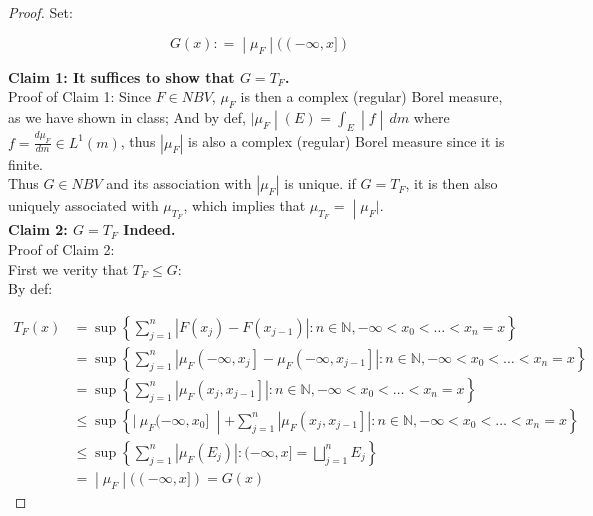 \documentclass{qlnotes-export}
\begin{document}
\begin{proof}

Set:

\[\left. G(x): = \middle| \mu_{F} \middle| (( - \infty,x\rbrack) \right.\]

\textbf{Claim 1: It suffices to show that \(G = T_{F}\).}\\
Proof of Claim 1: Since \(F \in NBV\), \(\mu_{F}\) is then a complex (regular) Borel measure, as we have shown in class; And by def, \(\left. |\mu_{F} \middle| (E) = \int_{E} \middle| f \middle| \, dm \right.\) where \(f = \frac{d\mu_{F}}{dm} \in L^{1}(m)\), thus \(|\mu_{F}|\) is also a complex (regular) Borel measure since it is finite.\\
Thus \(G \in NBV\) and its association with \(|\mu_{F}|\) is unique. if \(G = T_{F}\), it is then also uniquely associated with \(\mu_{T_{F}}\), which implies that \(\left. \mu_{T_{F}} = \middle| \mu_{F}| \right.\).\\
\textbf{Claim 2: \(G = T_{F}\) Indeed.}\\
Proof of Claim 2:\\
First we verity that \(T_{F} \leq G\):\\
By def:

\[\begin{matrix}
{T_{F}(x)} & {= \sup\left\{ {\sum\limits_{j = 1}^{n}\left| {F\left( x_{j} \right) - F\left( x_{j - 1} \right)} \right|:n \in {\mathbb{N}}, - \infty < x_{0} < \ldots < x_{n} = x} \right\}} \\
 & {= \sup\left\{ {\sum\limits_{j = 1}^{n}\left| {\mu_{F}\left( {- \infty,x_{j}} \right\rbrack - \mu_{F}\left( {- \infty,x_{j - 1}} \right\rbrack} \right|:n \in {\mathbb{N}}, - \infty < x_{0} < \ldots < x_{n} = x} \right\}} \\
 & {= \sup\left\{ {\sum\limits_{j = 1}^{n}\left| {\mu_{F}\left( {x_{j},x_{j - 1}} \right\rbrack} \right|:n \in {\mathbb{N}}, - \infty < x_{0} < \ldots < x_{n} = x} \right\}} \\
 & {\leq \sup\left\{ |\ \mu_{F}( - \infty,x_{0}\rbrack\  \middle| + \sum\limits_{j = 1}^{n}\left| {\mu_{F}\left( {x_{j},x_{j - 1}} \right\rbrack} \right|:n \in {\mathbb{N}}, - \infty < x_{0} < \ldots < x_{n} = x \right\}} \\
 & {\leq \sup\left\{ {\sum\limits_{j = 1}^{n}\left| {\mu_{F}\left( E_{j} \right)} \right|:( - \infty,x\rbrack = \bigsqcup\limits_{j = 1}^{n}E_{j}} \right\}} \\
 & \left. = \middle| \mu_{F} \middle| (( - \infty,x\rbrack) = G(x) \right.
\end{matrix}\]


\end{proof}
\end{document}

